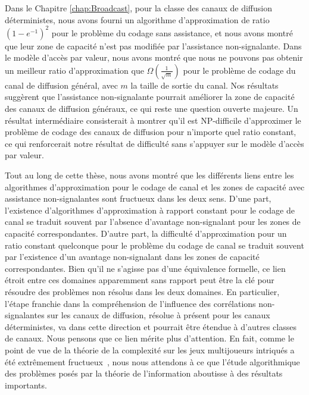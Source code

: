 Dans le Chapitre \ref{chap:Broadcast}, pour la classe des canaux de diffusion déterministes, nous avons fourni un algorithme d'approximation de ratio $(1-e^{-1})^2$ pour le problème du codage sans assistance, et nous avons montré que leur zone de capacité n'est pas modifiée par l'assistance non-signalante. Dans le modèle d'accès par valeur, nous avons montré que nous ne pouvons pas obtenir un meilleur ratio d'approximation que $\Omega\left(\frac{1}{\sqrt{m}}\right)$ pour le problème de codage du canal de diffusion général, avec $m$ la taille de sortie du canal. Nos résultats suggèrent que l'assistance non-signalante pourrait améliorer la zone de capacité des canaux de diffusion généraux, ce qui reste une question ouverte majeure. Un résultat intermédiaire consisterait à montrer qu'il est \textrm{NP}-difficile d'approximer le problème de codage des canaux de diffusion pour n'importe quel ratio constant, ce qui renforcerait notre résultat de difficulté sans s'appuyer sur le modèle d'accès par valeur.

Tout au long de cette thèse, nous avons montré que les différents liens entre les algorithmes d'approximation pour le codage de canal et les zones de capacité avec assistance non-signalantes sont fructueux dans les deux sens. D'une part, l'existence d'algorithmes d'approximation à rapport constant pour le codage de canal se traduit souvent par l'absence d'avantage non-signalant pour les zones de capacité correspondantes. D'autre part, la difficulté d'approximation pour un ratio constant quelconque pour le problème du codage de canal se traduit souvent par l'existence d'un avantage non-signalant dans les zones de capacité correspondantes. Bien qu'il ne s'agisse pas d'une équivalence formelle, ce lien étroit entre ces domaines apparemment sans rapport peut être la clé pour résoudre des problèmes non résolus dans les deux domaines. En particulier, l'étape franchie dans la compréhension de l'influence des corrélations non-signalantes sur les canaux de diffusion, résolue à présent pour les canaux déterministes, va dans cette direction et pourrait être étendue à d'autres classes de canaux. Nous pensons que ce lien mérite plus d'attention. En fait, comme le point de vue de la théorie de la complexité sur les jeux multijoueurs intriqués a été extrêmement fructueux~\cite{JNVWY20}, nous nous attendons à ce que l'étude algorithmique des problèmes posés par la théorie de l'information aboutisse à des résultats importants.
